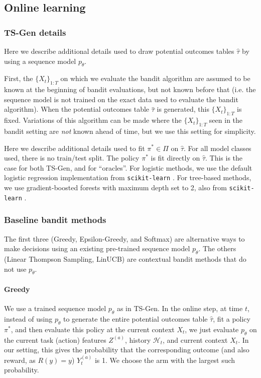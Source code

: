 \subsection{Online learning}

\subsubsection{TS-Gen details}
\label{app:more_generation}

Here we describe additional details used to draw potential outcomes tables $\hat{ \tau}$ 
by using a sequence model $p_\theta$. 

First, the $\{X_t\}_{1:T}$ on which we evaluate the bandit algorithm are assumed to be known at the beginning of bandit evaluations, but not known before that (i.e. the sequence model is not trained on the exact data used to evaluate the bandit algorithm). When the potential outcomes table $\hat{ \tau}$ is generated, this $\{X_t\}_{1:T}$ is fixed. Variations of this algorithm can be made where the $\{X_t\}_{1:T}$ seen in the bandit setting are \emph{not} known ahead of time, but we use this setting for simplicity. 


Here we describe additional details used to fit $\pi^*\in \Pi$ on $\hat{\tau}$. 
For all model classes used, there is no train/test split. The policy $\pi^*$ is fit directly on $\hat{\tau}$. This is the case for both TS-Gen, and for ``oracles''.  
For logistic methods, we use the default logistic regression implementation from \texttt{scikit-learn} \cite{scikit-learn}. 
For tree-based methods, we use gradient-boosted forests with maximum depth set to 2, also from \texttt{scikit-learn} \cite{scikit-learn}. 




\subsubsection{Baseline bandit methods}
\label{app:baseline_bandit_methods}
The first three (Greedy, Epsilon-Greedy, and Softmax) are alternative ways to make decisions using an existing pre-trained sequence model $p_\theta$. The others (Linear Thompson Sampling, LinUCB) are contextual bandit methods that do not use $p_\theta$. 


\paragraph{Greedy}
We use a trained sequence model $p_\theta$ as in TS-Gen. 
In the online step, at time $t$, instead of using $p_\theta$ to generate the entire potential outcomes table $\hat{\tau}$, fit a policy $\pi^*$, and then evaluate this policy at the current context $X_t$, we just evaluate $p_\theta$ on the current task (action) features $Z^{(a)}$, history $\mathcal H_t$, and current context $X_t$. In our setting, this gives the probability that the corresponding outcome (and also reward, as $R(y)=y$) $Y_t^{(a)}$ is 1. We choose the arm with the largest such probability. 



